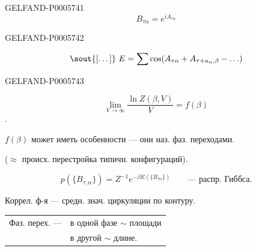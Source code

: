\begin{GelfandAdjacentEvidence}{GELFAND-P000574}{1}
\[
B_{\tau\alpha}=e^{i A_{\tau\alpha}}
\]
\end{GelfandAdjacentEvidence}
\begin{GelfandAdjacentEvidence}{GELFAND-P000574}{2}


\[
\text{\sout{[\ldots]}}\ E=\sum\cos(A_{\tau\alpha}+A_{\tau+a_\alpha,\beta}-\ldots)
\]
\end{GelfandAdjacentEvidence}
\begin{GelfandAdjacentEvidence}{GELFAND-P000574}{3}

\end{GelfandAdjacentEvidence}

\[
\lim_{V\to\infty}\frac{\ln Z(\beta,V)}{V}=f(\beta)
\]
\hfill{}.\par

\(f(\beta)\) может иметь особенности — они наз. фаз. переходами.

(\(\approx\) происх. перестройка типичн. конфигураций).

\[
p(\{B_{\tau,\alpha}\})=Z^{-1}e^{-\beta E(\{B_{\tau\alpha}\})}
\qquad\text{— распр. Гиббса.}
\]

Коррел. ф-я — средн. знач. циркуляции по контуру.

\noindent
\begin{tabular}{@{}ll@{}}
Фаз. перех. — & в одной фазе \(\sim\) площади\\
               & в другой \(\sim\) длине.
\end{tabular}


